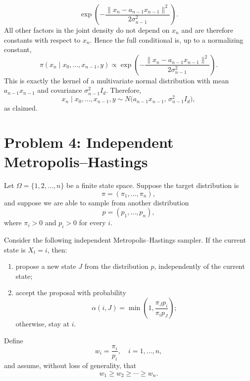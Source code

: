 \documentclass[answers,12pt,addpoints]{exam}
\begin{document}
\begin{enumerate}
\begin{enumerate}
\begin{solution}
\[
\exp\!\left(
    -\frac{\|x_n - a_{n-1} x_{n-1}\|^2}{2\sigma_{n-1}^2}
\right).
\]
All other factors in the joint density do not depend on $x_n$ and are therefore
constants with respect to $x_n$. Hence the full conditional is, up to a
normalizing constant,
\[
\pi(x_n \mid x_0,\dots,x_{n-1},y)
\propto
\exp\!\left(
    -\frac{\|x_n - a_{n-1} x_{n-1}\|^2}{2\sigma_{n-1}^2}
\right).
\]
This is exactly the kernel of a multivariate normal distribution with mean
$a_{n-1} x_{n-1}$ and covariance $\sigma_{n-1}^2 I_d$. Therefore,
\[
x_n \mid x_0,\dots,x_{n-1},y
\sim N\bigl(a_{n-1} x_{n-1},\,\sigma_{n-1}^2 I_d\bigr),
\]
as claimed.
        \end{solution}
    \end{enumerate}
\end{enumerate}



\section*{Problem 4: Independent Metropolis--Hastings}

Let $\Omega = \{1, 2, \ldots, n\}$ be a finite state space. Suppose the target distribution is
\[
\pi = (\pi_1, \ldots, \pi_n),
\]
and suppose we are able to sample from another distribution
\[
p = (p_1, \ldots, p_n),
\]
where $\pi_i > 0$ and $p_i > 0$ for every $i$.

Consider the following independent Metropolis--Hastings sampler. If the current state is $X_t = i$, then:
\begin{enumerate}
    \item propose a new state $J$ from the distribution $p$, independently of the current state;
    \item accept the proposal with probability
    \[
    \alpha(i,J) = \min\left(1,\frac{\pi_J p_i}{\pi_i p_J}\right);
    \]
    otherwise, stay at $i$.
\end{enumerate}

Define
\[
w_i = \frac{\pi_i}{p_i}, \quad i = 1,\ldots,n,
\]
and assume, without loss of generality, that
\[
w_1 \ge w_2 \ge \cdots \ge w_n.
\]
\end{document}
